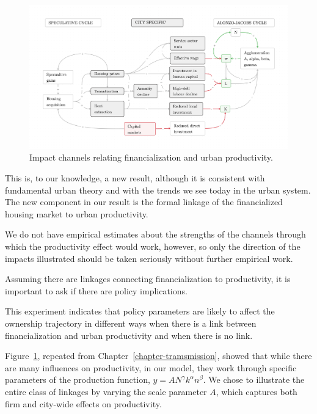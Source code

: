 \begin{figure}[h!tb]\label{fig-impact-channels2}
\begin{adjustwidth}{-0.24\textwidth}{-0.24\textwidth}
\centering
\includegraphics[scale=.15 ]{fig/impact-channels.png}%
\end{adjustwidth}
\caption{Impact channels relating financialization and urban productivity.}
\end{figure}

This is, to our knowledge, a new result, although it is consistent with fundamental urban theory and with the trends we see today in the urban system. The new component in our result is the formal linkage of the financialized housing market to urban productivity.

We do not have empirical estimates about the strengths of the channels through which the productivity effect would work, however, so only the direction of the impacts illustrated should be taken seriously without further empirical work.  

Assuming there are linkages connecting financialization to productivity, it is important to ask if there are policy implications. 

This experiment indicates that policy parameters are likely to affect the ownership trajectory in different ways when there is a link between financialization and urban productivity and when there is no link.

Figure~\ref{fig-impact-channels2}, repeated from Chapter~\ref{chapter-tramsmission}, showed that while there are many influences on productivity, in our model, they work through specific parameters of the production function, $y=AN^\gamma k^\alpha n^\beta$. 
We chose to illustrate the entire class of linkages by varying the scale parameter $A$, which captures both firm and city-wide effects on productivity. 




